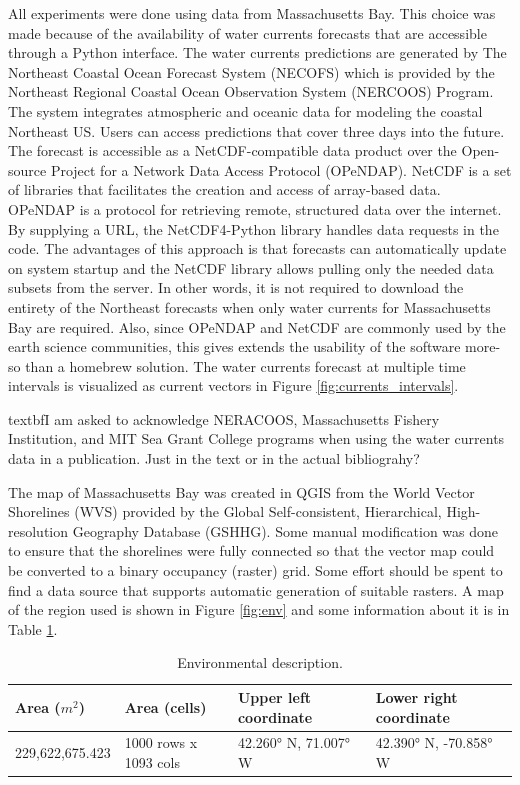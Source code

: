 \documentclass{tamuccthesis}
\begin{document}
All experiments were done using data from Massachusetts Bay. This choice was made because of the availability of water currents forecasts that are accessible through a Python interface. The water currents predictions are generated by The Northeast Coastal Ocean Forecast System (NECOFS) which is provided by the Northeast Regional Coastal Ocean Observation System (NERCOOS) Program. The system integrates atmospheric and oceanic data for modeling the coastal Northeast US. Users can access predictions that cover three days into the future. The forecast is accessible as a NetCDF-compatible data product over the Open-source Project for a Network Data Access Protocol (OPeNDAP). NetCDF is a set of libraries that facilitates the creation and access of array-based data. OPeNDAP is a protocol for retrieving remote, structured data over the internet. By supplying a URL, the NetCDF4-Python library handles data requests in the code. The advantages of this approach is that forecasts can automatically update on system startup and the NetCDF library allows pulling only the needed data subsets from the server. In other words, it is not required to download the entirety of the Northeast forecasts when only water currents for Massachusetts Bay are required. Also, since OPeNDAP and NetCDF are commonly used by the earth science communities, this gives extends the usability of the software more-so than a homebrew solution. The water currents forecast at multiple time intervals is visualized as current vectors in Figure \ref{fig:currents_intervals}.

textbf{I am asked to acknowledge NERACOOS, Massachusetts Fishery Institution, and MIT Sea Grant College programs  when using the water currents data in a publication. Just in the text or in the actual bibliograhy?}

The map of Massachusetts Bay was created in QGIS from the World Vector Shorelines (WVS) provided by the Global Self-consistent, Hierarchical, High-resolution Geography Database (GSHHG). Some manual modification was done to ensure that the shorelines were fully connected so that the vector map could be converted to a binary occupancy (raster) grid. Some effort should be spent to find a data source that supports automatic generation of suitable rasters. A map of the region used is shown in Figure \ref{fig:env} and some information about it is in Table \ref{tbl:env_desc}.

\begin{table}[H]\small
    \begin{tabular}{|l|l|l|l|}
\hline
Area ($m^2$) & Area (cells) & Upper left coordinate & Lower right coordinate \\
\hline
229,622,675.423 & 1000 rows x 1093 cols  &  42.260° N, 71.007° W & 42.390° N, -70.858° W \\
\hline
    \end{tabular}
    \caption[Environmental description.]{Environmental description.}
    \label{tbl:env_desc}
\end{table}
\end{document}
